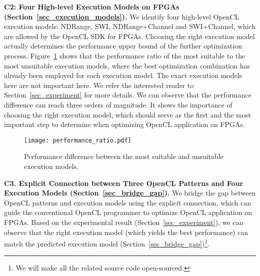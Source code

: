 \vspace{0.4em}
\noindent
{\bf C2: Four High-level Execution Models on FPGAs (Section~\ref{sec_execution_models}). }We identify four high-level OpenCL execution models: NDRange, SWI, NDRange+Channel and SWI+Channel, which are allowed by the OpenCL SDK for FPGAs. Choosing the right execution model actually determines the performance upper bound of the further optimization process. Figure~\ref{fig_intro_performance_difference} shows that the performance ratio of the most suitable to the most unsuitable execution models, where the best optimization combination has already been employed for each execution model. The exact execution models here are not important here. We refer the interested reader to Section~\ref{sec_experiment} for more details. We can observe that the performance difference can reach three orders of magnitude. It shows the importance of choosing the right execution model, which should serve as the first and the most important step to determine when optimizing OpenCL application on FPGAs. %
\begin{figure}
	\centering
	\texttt{[image: performance\_ratio.pdf]}
	\vspace{-2.5ex}
	\caption{Performance difference between the most suitable and unsuitable execution models.}%
	\vspace{-4ex}
	\label{fig_intro_performance_difference}
\end{figure} 


%

\vspace{0.4em}
\noindent
{\bf C3. Explicit Connection between Three OpenCL Patterns and Four Execution Models (Section~\ref{sec_bridge_gap}). }We bridge the gap between OpenCL patterns and execution models using the explicit connection, which can guide the conventional OpenCL programmer to optimize OpenCL application on FPGAs. 
Based on the experimental result (Section~\ref{sec_experiment}), we can observe that the right execution model (which yields the best performance) can match the predicted execution model (Section~\ref{sec_bridge_gap})\footnote{We will make all the related source code open-sourced. }. %

